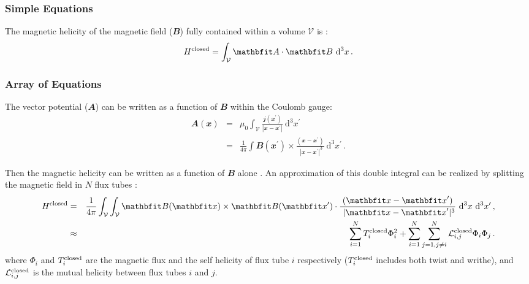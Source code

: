 \documentclass[namedreferences,hyperref,optionalrh,solaromanenum]{spr-sola}
\renewcommand{\vec}[1]{{\mathbfit #1}}
\newcommand{\vol}{{\mathcal V}}
\newcommand{\dv}{~{\mathrm d}^3 x}
\newcommand{\intv}{\int_{\vol}^{}}
\newcommand{\avec}{\vec A}
\newcommand{\bb}{\vec B}
\newcommand{\jj}{\vec j}
\newcommand{\xx}{\vec x}
\begin{document}
\subsubsection{Simple Equations} %
\label{S-simple-equations}
The magnetic helicity of the magnetic field ($\vec{B}$) fully contained 
within a volume $\vol $ is \citep{Elsasser56}:
\begin{equation}  \label{Eq-H-def}
 H^{\rm closed} = \intv \avec \cdot \bb \dv \,.
\end{equation}

\subsubsection{Array of Equations} %
\label{S-array-equations}
The vector potential ($\avec$) can be written as a function of $\bb$
within the Coulomb gauge:
\begin{eqnarray}   
 \avec (\xx) &=& \mu_{0}\intv \frac{\jj (\xx  ^\prime)}
                 { | \xx - \xx  ^\prime |} \dv ^\prime          
                   \nonumber \\      %
             &=& \frac{1}{4\pi} \int \bb (\xx ^\prime ) \times
                 \frac{(\xx  - \xx ^\prime)}{\,\, |\xx - \xx ^\prime |^3}  
                                       \dv ^\prime   \,. 
                   \label{Eq-A-B}    %
\end{eqnarray}

Then the magnetic helicity can be written as a function of $\bb$
alone \citep{Moffatt69}. An approximation of this double integral 
can be realized by splitting
the magnetic field in $N$ flux tubes \citep{BergerF84}:
\begin{eqnarray}   
H^{\rm closed} &=& \frac{1}{4\pi} \intv \intv
                  \bb (\xx ) \times \bb (\xx ^\prime )
                  \cdot \frac{(\xx  - \xx ^\prime)}{\,\, |\xx - \xx ^\prime |^3}
                  \dv \dv ^\prime \,,                     \label{Eq-H-B} \\      
              &\approx & \sum_{i=1}^N T_i^{\rm closed} \Phi_i^2
                       + \sum_{i=1}^N \sum_{j=1,j \neq i}^N
                         {\mathcal L}^{\rm closed}_{i,j} \Phi_i \Phi_j  \,.
                   \label{Eq-H-N}     %
\end{eqnarray}
where $\Phi_i$ and $T_i^{\rm closed}$ are the magnetic flux and the
self helicity of flux tube $i$ respectively ($T_i^{\rm closed}$
includes both twist and writhe), and ${\mathcal L}^{\rm
closed}_{i,j}$ is the mutual helicity between flux tubes $i$ and
$j$.
\end{document}
